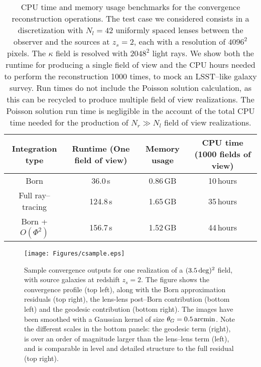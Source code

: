 \documentclass[reprint,aps,prd,superscriptaddress,showkeys,showpacs]{revtex4-1}
\begin{document}
\begin{table*}
\begin{center}

\begin{tabular}{c|c|c|c}

\textbf{Integration type} & \textbf{Runtime (One field of view)} & \textbf{Memory usage} & \textbf{CPU time (1000 fields of view)} \\ \hline \hline
Born & 36.0\,s & 0.86\,GB & 10\,hours  \\
Full ray--tracing & 124.8\,s & 1.65\,GB & 35\,hours  \\
Born + $O(\Phi^2)$ & 156.7\,s & 1.52\,GB & 44\,hours \\ \hline

\end{tabular}

\end{center}

\caption{CPU time and memory usage benchmarks for the convergence reconstruction operations. The test case we considered consists in a discretization with $N_l=42$ uniformly spaced lenses between the observer and the sources at $z_s=2$, each with a resolution of $4096^2$ pixels. The $\kappa$ field is resolved with $2048^2$ light rays. We show both the runtime for producing a single field of view and the CPU hours needed to perform the reconstruction 1000 times, to mock an LSST--like galaxy survey. Run times do not include the Poisson solution calculation, as this can be recycled to produce multiple field of view realizations. The Poisson solution run time is negligible in the account of the total CPU time needed for the production of $N_r\gg N_l$ field of view realizations.}
\label{tab:benchmarks}

\end{table*}

\begin{figure*}
\begin{center}
\texttt{[image: Figures/csample.eps]}
\end{center}
\caption{Sample convergence outputs for one realization of a $(3.5\,{\rm deg})^2$ field, with source galaxies at redshift $z_s=2$. The figure shows the convergence profile (top left), along with the Born approximation residuals (top right), the lens-lens post--Born contribution (bottom left) and the geodesic contribution (bottom right). The images have been smoothed with a Gaussian kernel of size $\theta_G=0.5\,{\rm arcmin}$.  Note the different scales in the bottom panels: the geodesic term (right), is over an order of magnitude larger than the lens--lens term (left), and is comparable in level and detailed structure to the full residual (top right).} 
\label{fig:csample}
\end{figure*} 
\end{document}
